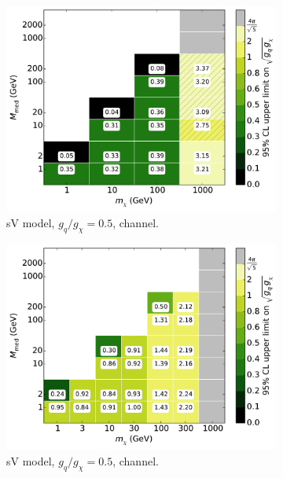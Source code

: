 \begin{figure}
  \centering
  \begin{subfigure}[t]{0.32\textwidth}
    \centering
    \includegraphics[width=1.\textwidth]{figures/grid_basepoints_SVD_rat5_monojet.pdf}
    \caption{sV model, $g_q/g_{\chi} = 0.5$, \monojet channel.}
  \end{subfigure}
  \begin{subfigure}[t]{0.32\textwidth}
    \centering
    \includegraphics[width=1.\textwidth]{figures/grid_allpoints_SVD_rat5.pdf}
    \caption{sV model, $g_q/g_{\chi} = 0.5$, \monoZ channel.}
  \end{subfigure}
  \begin{subfigure}[t]{0.32\textwidth}

\end{subfigure}
\end{figure}
